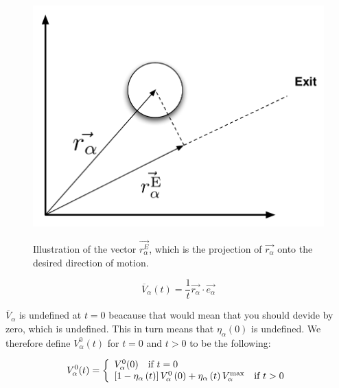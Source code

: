 \begin{figure}[ht]
    \centering
    {\includegraphics[scale=0.35]{Figures/NotationOfAgent2.pdf}} 
    \caption{Illustration of the vector $ \vec{r_{\alpha}^{E}}$, which is the 
    projection of $ \vec{r_{\alpha}} $ onto the desired direction of motion.}
    \label{impatience}
\end{figure}

\begin{equation}\label{averagespeed}
   \overline{V}_{\alpha} \left( t \right) =
   \frac{1}{t} \vec{r_{\alpha}}\cdot \vec{e_{\alpha}} 
\end{equation}

$\overline{V}_{\alpha}$ is undefined at $t=0$ beacause that would mean 
that you should devide by zero, which is undefined. This in turn means 
that $\eta_{\alpha}(0)$ is undefined. We therefore define 
$V_{\alpha}^{0}(t)$ for $t=0$ and $t>0$ to be the following:

\[
  V_{\alpha}^{0} (t) = \left\{ 
  \begin{array}{l l}
    V_{\alpha}^{0}(0) \quad \text{if $t=0$}\\
    \left[ 1 - \eta_{\alpha} \left( t \right) \right] 
    V_{\alpha}^{0} \left( 0 \right) +
    \eta_{\alpha} \left( t \right)V_{\alpha}^{\text{max}} \quad \text{if $t>0$}\\
  \end{array} \right.
\]

